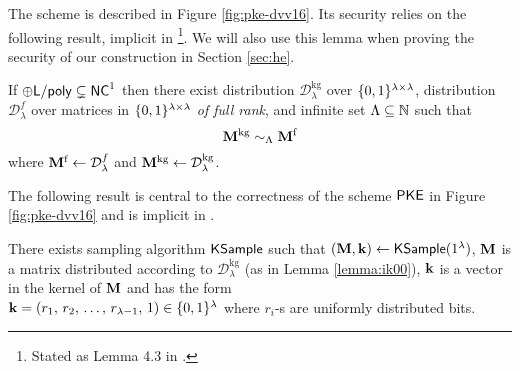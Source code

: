 The scheme is described in Figure \ref{fig:pke-dvv16}. Its security relies on the
 following result, implicit in \cite{ik00}\footnote{Stated as Lemma 4.3 in \cite{fgcrypto}.}. We will also use this lemma when proving the security of our construction in Section \ref{sec:he}.
 

\begin{lemma}[\cite{ik00}]
\label{lemma:ik00}
If $\oplus {\ensuremath{\mathsf{L}}} / \mathsf{poly} \subsetneq {\ensuremath{\mathsf{NC}}}^1$ then there exist distribution $\mathcal{D}^{\text{kg}}_{\lambda}$ over  $\{0, 1\}^{\lambda \times \lambda}$, distribution $\mathcal{D}^{f}_{\lambda}$ over matrices in $\{0, 1\}^{\lambda \times \lambda}$ \textit{of full rank}, and infinite set $\Lambda \subseteq \mathbb{N}$ such that
\[
\mathbf{M}^{\text{kg}} \sim_{\Lambda} \mathbf{M}^{\mathcal{\text{f}}}
\]
where $\mathbf{M}^{\mathcal{\text{f}}} \gets \mathcal{D}^{f}_{\lambda}$ and $\mathbf{M}^{\text{kg}} \gets  \mathcal{D}^{\text{kg}}_{\lambda}$.
\end{lemma}

The following result is central to the correctness of the scheme $\mathsf{PKE}$ 
in Figure \ref{fig:pke-dvv16} and is implicit in \cite{fgcrypto}.

\begin{lemma}
\label{lemma:dvv16-sampling}
There exists sampling algorithm $\mathsf{KSample}$ such that $(\mathbf{M}, \mathbf{k}) \gets \mathsf{KSample}(1^{\lambda})$, $\mathbf{M}$ is a matrix distributed according to $\mathcal{D}^{\text{kg}}_{\lambda}$ (as in Lemma \ref{lemma:ik00}), $\mathbf{k}$ is a vector in the kernel of $\mathbf{M}$ and has the form \\$\mathbf{k} = (r_1, \, r_2, \, \dots, \, r_{\lambda-1}, \, 1) \in \{0, 1\}^{\lambda}$ where $r_i$-s are uniformly distributed bits.
\end{lemma}




